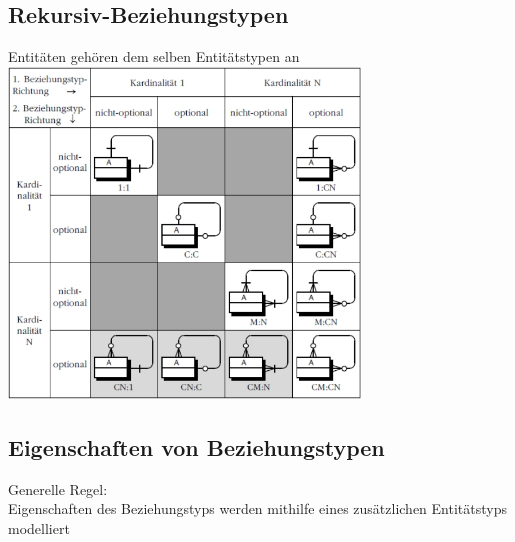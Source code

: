 \documentclass{scrreprt}
\begin{document}
\subsection{Rekursiv-Beziehungstypen}
Entitäten gehören dem selben Entitätstypen an
\\\includegraphics[width=0.7\textwidth]{"graphics/rekursivBZ"}
\subsection{Eigenschaften von Beziehungstypen}
Generelle Regel:
\\Eigenschaften des Beziehungstyps werden mithilfe eines zusätzlichen Entitätstyps modelliert
\end{document}
